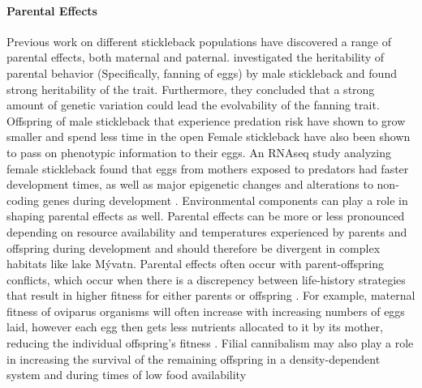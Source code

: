 \documentclass[12pt]{extarticle}
\begin{document}
\paragraph{Parental Effects}
Previous work on different stickleback populations have discovered a range of parental effects, both maternal and paternal. \citet{Bell2018} investigated the heritability of parental behavior (Specifically, fanning of eggs) by male stickleback and found strong heritability of the trait. Furthermore, they concluded that a strong amount of genetic variation could lead the evolvability of the fanning trait. Offspring of male stickleback that experience predation risk have shown to grow smaller and spend less time in the open \citep{Bell2016, Stein2014} Female stickleback have also been shown to pass on phenotypic information to their eggs. An RNAseq study analyzing female stickleback found that eggs from mothers exposed to predators had faster development times, as well as major epigenetic changes and alterations to non-coding genes during development \citep{Mommer2014, Bell2016}. Environmental components can play a role in shaping parental effects as well. Parental effects can be more or less pronounced depending on resource availability and temperatures experienced by parents and offspring during development \citep{Rasanen2007} and should therefore be divergent in complex habitats like lake M\'yvatn. Parental effects often occur with parent-offspring conflicts, which occur when there is a discrepency between life-history strategies that result in higher fitness for either parents or offspring \citep{Uller2008}. For example, maternal fitness of oviparus organisms will often increase with increasing numbers of eggs laid, however each egg then gets less nutrients allocated to it by its mother, reducing the individual offspring's fitness \citep{Uller2008, Rasanen2007}. Filial cannibalism may also play a role in increasing the survival of the remaining offspring in a density-dependent system and during times of low food availability \citep{Bartrons2018} \\
\end{document}
